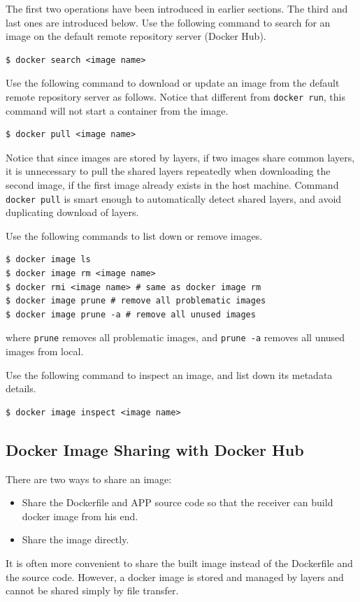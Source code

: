 The first two operations have been introduced in earlier sections. The third and last ones are introduced below. Use the following command to search for an image on the default remote repository server (Docker Hub).
\begin{lstlisting}
$ docker search <image name>
\end{lstlisting}
Use the following command to download or update an image from the default remote repository server as follows. Notice that different from \verb|docker run|, this command will not start a container from the image.
\begin{lstlisting}
$ docker pull <image name>
\end{lstlisting}
Notice that since images are stored by layers, if two images share common layers, it is unnecessary to pull the shared layers repeatedly when downloading the second image, if the first image already exists in the host machine. Command \verb|docker pull| is smart enough to automatically detect shared layers, and avoid duplicating download of layers.

Use the following commands to list down or remove images.
\begin{lstlisting}
$ docker image ls
$ docker image rm <image name>
$ docker rmi <image name> # same as docker image rm
$ docker image prune # remove all problematic images
$ docker image prune -a # remove all unused images
\end{lstlisting}
where \verb|prune| removes all problematic images, and \verb|prune -a| removes all unused images from local.

Use the following command to inspect an image, and list down its metadata details.
\begin{lstlisting}
$ docker image inspect <image name>
\end{lstlisting}

\subsection{Docker Image Sharing with Docker Hub}

There are two ways to share an image:
\begin{itemize}
	\item Share the Dockerfile and APP source code so that the receiver can build docker image from his end.
	\item Share the image directly.
\end{itemize}
It is often more convenient to share the built image instead of the Dockerfile and the source code. However, a docker image is stored and managed by layers and cannot be shared simply by file transfer. 


